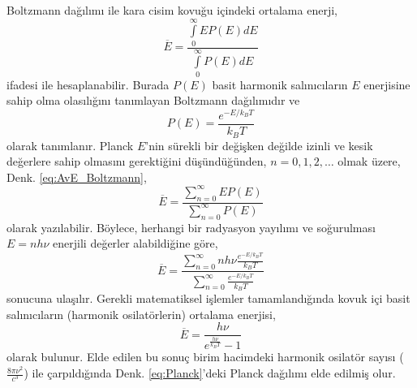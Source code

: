 \documentclass[a4paper,12pt, twoside]{article}
\begin{document}
Boltzmann dağılımı ile kara cisim kovuğu içindeki ortalama enerji,
\begin{equation}
\label{eq:AvE_Boltzmann}
\overline E =\frac{\int \limits_0^\infty E P(E) dE}{\int \limits_0^\infty P(E) dE} 
\end{equation} 
ifadesi ile hesaplanabilir. Burada $P(E)$ basit harmonik salınıcıların $E$ enerjisine sahip olma olasılığını tanımlayan Boltzmann dağılımıdır ve
\begin{equation}
\label{eq:Boltzmann}
P(E) = \frac{e^{-E/k_BT}}{k_BT}
\end{equation} 
olarak tanımlanır. Planck $E$'nin sürekli bir değişken değilde izinli ve kesik değerlere sahip olmasını gerektiğini düşündüğünden, $n = 0, 1, 2, \dots$  olmak üzere, Denk. \ref{eq:AvE_Boltzmann},
\begin{equation}
\label{eq:Boltzmann_Planck}
\overline E =\frac{\sum \limits_{n=0}^\infty E P(E)}{\sum \limits_{n=0}^\infty P(E)} 
\end{equation}
olarak yazılabilir. Böylece, herhangi bir radyasyon yayılımı ve soğurulması $E=nh\nu$ enerjili değerler alabildiğine göre,
\begin{equation}
\label{eq:Boltzmann_Planck}
\overline E =\frac{\sum \limits_{n=0}^\infty nh\nu \frac{e^{-E/k_BT}}{k_BT}}{\sum \limits_{n=0}^\infty \frac{e^{-E/k_BT}}{k_BT}} 
\end{equation}
sonucuna ulaşılır. Gerekli matematiksel işlemler tamamlandığında \cite{book:EisbergResnick} kovuk içi basit salınıcıların (harmonik osilatörlerin) ortalama enerjisi,
\begin{equation}
\label{eq:Planck_Av_E}
\overline E = \frac{h\nu}{e^{\frac{h \nu}{k_{B} T}} - 1}
\end{equation}
olarak bulunur. Elde edilen bu sonuç birim hacimdeki harmonik osilatör sayısı ($\frac{8 \pi \nu^{2}}{c^{3}}$) ile çarpıldığında Denk. \ref{eq:Planck}'deki Planck dağılımı elde edilmiş olur. 
\end{document}
